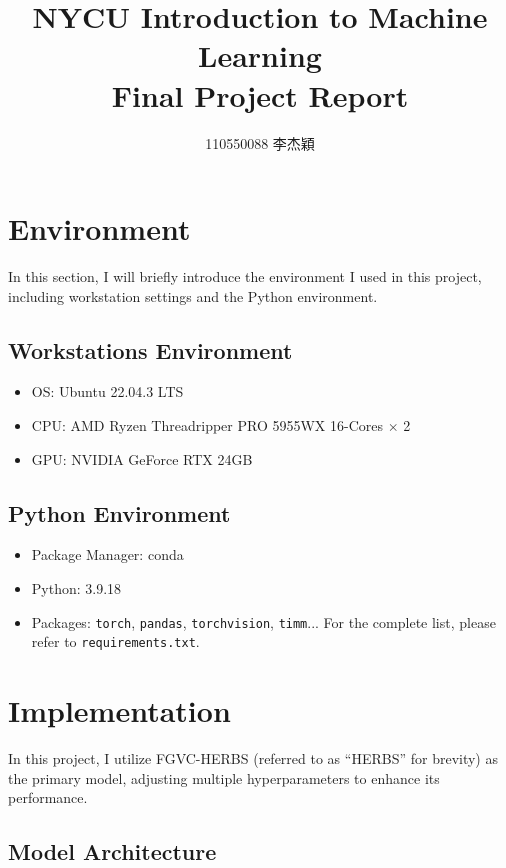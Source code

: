 \documentclass[twocolumn]{extarticle}
\title{NYCU Introduction to Machine Learning \\ Final Project Report}
\author{110550088 李杰穎}
\date{}
\begin{document}
\maketitle

\section{Environment}

In this section, I will briefly introduce the environment I used in this project, including workstation settings and the Python environment.

\subsection{Workstations Environment}

\begin{itemize}
\item OS: Ubuntu 22.04.3 LTS
\item CPU: AMD Ryzen Threadripper PRO 5955WX 16-Cores $\times$ 2
\item GPU: NVIDIA GeForce RTX 24GB
\end{itemize}

\subsection{Python Environment}

\begin{itemize}
\item Package Manager: conda
\item Python: 3.9.18
\item Packages: \texttt{torch}, \texttt{pandas}, \texttt{torchvision}, \texttt{timm}... For the complete list, please refer to \texttt{requirements.txt}.
\end{itemize}



\section{Implementation}

In this project, I utilize FGVC-HERBS\cite{chou2023fine} (referred to as ``HERBS'' for brevity) as the primary model, adjusting multiple hyperparameters to enhance its performance. 

\subsection{Model Architecture}
\end{document}
